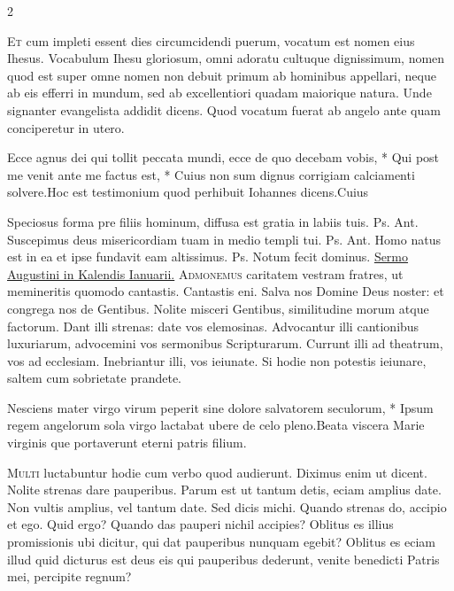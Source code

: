 \begin{multicols*}{2}
\begin{responsory}
\end{responsory}%
\lettrine[lines=2]{\zallmancaps \color{Red} E}{t} cum impleti essent dies circumcidendi puerum, vocatum est nomen eius Ihesus. Vocabulum Ihesu gloriosum, omni adoratu cultuque dignissimum, nomen quod est super omne nomen non debuit primum ab hominibus appellari, neque ab eis efferri in mundum, sed ab excellentiori quadam maiorique natura. Unde signanter evangelista addidit dicens. Quod vocatum fuerat ab angelo ante quam conciperetur in utero.
\begin{responsory-final}
{Ecce agnus dei qui tollit peccata mundi, ecce de quo decebam vobis, * Qui post me venit ante me factus est, * Cuius non sum dignus corrigiam calciamenti solvere.}{Hoc est testimonium quod perhibuit Iohannes dicens.}{Cuius}
\end{responsory-final}%
 Speciosus forma pre filiis hominum, diffusa est gratia in labiis tuis. {\color{Red} Ps.}  {\color{Red} Ant.} Suscepimus deus misericordiam tuam in medio templi tui. {\color{Red} Ps.}  {\color{Red} Ant.} Homo natus est in ea et ipse fundavit eam altissimus. {\color{Red} Ps.}  \V Notum fecit dominus.
 \ul{Sermo Augustini in Kalendis Ianuarii.} {\color{Red} \grecross}
\lettrine[lines=2]{\zallmancaps \color{Blue} A}{dmonemus} caritatem vestram fratres, ut memineritis quomodo cantastis. Cantastis eni. Salva nos Domine Deus noster: et congrega nos de Gentibus. Nolite misceri Gentibus, similitudine morum atque factorum. Dant illi strenas: date vos elemosinas. Advocantur illi cantionibus luxuriarum, advocemini vos sermonibus Scripturarum. Currunt illi ad theatrum, vos ad ecclesiam. Inebriantur illi, vos ieiunate. Si hodie non potestis ieiunare, saltem cum sobrietate prandete.
\begin{responsory}
{Nesciens mater virgo virum peperit sine dolore salvatorem seculorum, * Ipsum regem angelorum sola virgo lactabat ubere de celo pleno.}{Beata viscera Marie virginis que portaverunt eterni patris filium.}
\end{responsory}%
\lettrine[lines=2]{\zallmancaps \color{Red} M}{ulti} luctabuntur hodie cum verbo quod audierunt. Diximus enim ut dicent. Nolite strenas dare pauperibus. Parum est ut tantum detis, eciam amplius date. Non vultis amplius, vel tantum date. Sed dicis michi. Quando strenas do, accipio et ego. Quid ergo? Quando das pauperi nichil accipies? Oblitus es illius promissionis ubi dicitur, qui dat pauperibus nunquam egebit? Oblitus es eciam illud quid dicturus est deus eis qui pauperibus dederunt, venite benedicti Patris mei, percipite regnum?

\end{multicols*}
